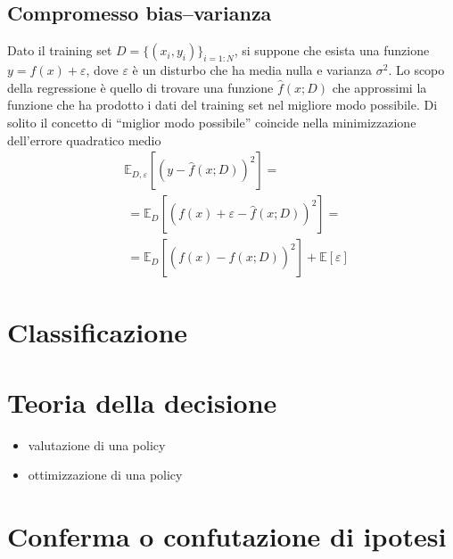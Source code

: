 \subsection{Compromesso bias--varianza}
Dato il training set $D = \{ (x_i, y_i) \}_{i=1:N}$, si suppone che esista una funzione $y = f(x) + \varepsilon$, dove $\varepsilon$ è un disturbo che ha media nulla e varianza $\sigma^2$. Lo scopo della regressione è quello di trovare una funzione $\hat{f}(x; D)$ che approssimi la funzione che ha prodotto i dati del training set nel migliore modo possibile. Di solito il concetto di ``miglior modo possibile'' coincide nella minimizzazione dell'errore quadratico medio
\begin{equation}
\begin{aligned}
    & \mathbb{E}_{D,\varepsilon}\left[ \left(y - \hat{f}(x;D)\right)^2 \right] = \\
    & \ = \mathbb{E}_{D}\left[ \left(f(x) + \varepsilon - \hat{f}(x;D)\right)^2 \right] = \\
    & \ = \mathbb{E}_{D}\left[ \left( f(x) - \hat{f}(x;D) \right)^2 \right] + \mathbb{E} \left[ \varepsilon  \right]
\end{aligned}
\end{equation}

\section{Classificazione}

\section{Teoria della decisione}
{\color{red}
\begin{itemize}
    \item valutazione di una policy
    \item ottimizzazione di una policy
\end{itemize}}

\section{Conferma o confutazione di ipotesi}

